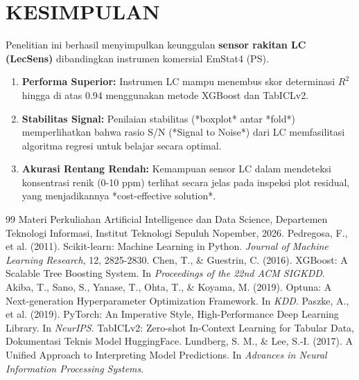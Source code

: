 \documentclass[10pt, twocolumn, a4paper]{article}
\begin{document}
\section{KESIMPULAN}
Penelitian ini berhasil menyimpulkan keunggulan \textbf{sensor rakitan LC (LecSens)} dibandingkan instrumen komersial EmStat4 (PS). 
\begin{enumerate}
    \item \textbf{Performa Superior:} Instrumen LC mampu menembus skor determinasi $R^2$ hingga di atas 0.94 menggunakan metode XGBoost dan TabICLv2.
    \item \textbf{Stabilitas Signal:} Penilaian stabilitas (*boxplot* antar *fold*) memperlihatkan bahwa rasio S/N (*Signal to Noise*) dari LC memfasilitasi algoritma regresi untuk belajar secara optimal.
    \item \textbf{Akurasi Rentang Rendah:} Kemampuan sensor LC dalam mendeteksi konsentrasi renik (0-10 ppm) terlihat secara jelas pada inspeksi plot residual, yang menjadikannya *cost-effective solution*.
\end{enumerate}

\begin{thebibliography}{99}
 Materi Perkuliahan Artificial Intelligence dan Data Science, Departemen Teknologi Informasi, Institut Teknologi Sepuluh Nopember, 2026.
 Pedregosa, F., et al. (2011). Scikit-learn: Machine Learning in Python. \textit{Journal of Machine Learning Research}, 12, 2825-2830.
 Chen, T., \& Guestrin, C. (2016). XGBoost: A Scalable Tree Boosting System. In \textit{Proceedings of the 22nd ACM SIGKDD}.
 Akiba, T., Sano, S., Yanase, T., Ohta, T., \& Koyama, M. (2019). Optuna: A Next-generation Hyperparameter Optimization Framework. In \textit{KDD}.
 Paszke, A., et al. (2019). PyTorch: An Imperative Style, High-Performance Deep Learning Library. In \textit{NeurIPS}.
 TabICLv2: Zero-shot In-Context Learning for Tabular Data, Dokumentasi Teknis Model HuggingFace.
 Lundberg, S. M., \& Lee, S.-I. (2017). A Unified Approach to Interpreting Model Predictions. In \textit{Advances in Neural Information Processing Systems}.
\end{thebibliography}
\end{document}
